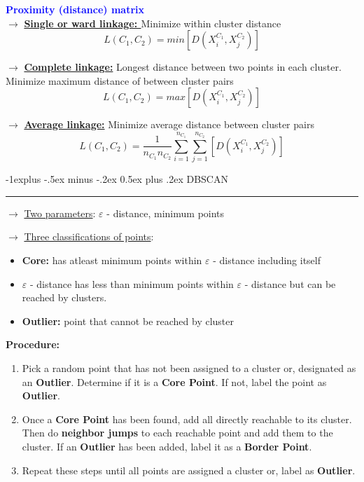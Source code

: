 \documentclass[letterpaper, 10.5pt,landscape]{article}
\makeatletter
\renewcommand{\subsection}{\@startsection{subsection}{2}{0mm}%
                                {-1explus -.5ex minus -.2ex}%
                                {0.5ex plus .2ex}%
                                {\normalfont\normalsize\bfseries}}
\makeatother
\begin{document}
\begin{multicols*}{3}
\textbf{\textcolor{blue}{Proximity (distance) matrix}} \\
$\rightarrow$ \textbf{\underline{Single or ward linkage: }} Minimize within cluster distance
\vspace{-3pt}
\[\boxed{ L(C_{1}, C_{2}) = min\left[D \left(X^{C_1}_{i}, X^{C_2}_{j}\right) \right]} \]


$\rightarrow$ \textbf{\underline{Complete linkage:}} Longest distance between two points in each cluster. Minimize maximum distance of between cluster pairs
\vspace{-3pt}
\[\boxed{L(C_{1}, C_{2}) = max\left[D \left(X^{C_1}_{i}, X^{C_2}_{j}\right) \right]}  \]


$\rightarrow$ \textbf{\underline{Average linkage:}} Minimize average distance between cluster pairs
\vspace{-3pt}
\[\boxed{L(C_{1}, C_{2}) = \frac{1}{n_{C_1} n_{C_2}} \sum^{n_{C_1}}_{i=1} \sum^{n_{C_2}}_{j=1}  \left[D \left(X^{C_1}_{i}, X^{C_2}_{j}\right) \right]}  \]

\subsection{DBSCAN} {\color{teal}\hrule height 0.5pt} \smallskip

$\rightarrow$ \underline{Two parameters}: $\varepsilon$ - distance, minimum points 

\vspace{2pt}

$\rightarrow$ \underline{Three classifications of points}:

\begin{itemize}
    \vspace{-3pt}
    \item \textbf{Core:} has atleast minimum points within  $\varepsilon$ - distance including itself
    \vspace{-3pt}
    \item $\varepsilon$ - distance has less than minimum points within $\varepsilon$ - distance but can be reached by clusters.
    \vspace{-3pt}
    \item \textbf{Outlier:} point that cannot be reached by cluster
\end{itemize}
\textbf{Procedure:}
\begin{enumerate}
    \item Pick a random point that has not been assigned to a cluster or, designated as an \textbf{Outlier}. Determine if it is a \textbf{Core Point}. If not, label the point as\textbf{ Outlier}.
    \item Once a \textbf{Core Point} has been found, add all directly reachable to its cluster. Then do \textbf{neighbor jumps} to each reachable point and add them to the cluster. If an \textbf{Outlier} has been added, label it as a \textbf{Border Point}.
    \item Repeat these steps until all points are assigned a cluster or, label as \textbf{Outlier}.
\end{enumerate}






\end{multicols*}
\end{document}
